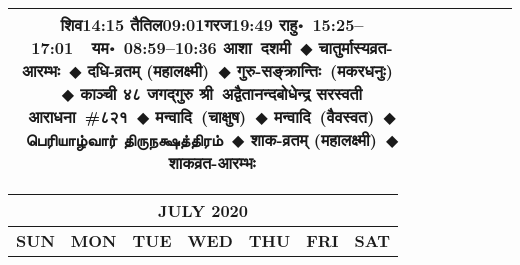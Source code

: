 \documentclass[a3paper,12pt,landscape]{article}
\newcommand{\eventsep}{~$\Diamondblack$ }
\newcommand{\To}{\hspace{1pt}\raisebox{0pt}{\tiny\RIGHTarrow}\hspace{1pt}}
\newcommand{\tamil}[1]{%
{\fontspec[Scale=0.9,FakeStretch=0.9]{Noto Sans Tamil} \footnotesize #1}}
\newcommand{\rahuyama}[2]{%
{राहु॰~\textsf{#1}~~यम॰~\textsf{#2}}
}
\begin{document}
\begin{center}
\begin{tabular}{|c|c|c|c|c|c|c|}
{{\mbox{शिव\To{}\textsf{14:15\hspace{2ex}}}}%
{\mbox{तैतिल\To{}\textsf{09:01\hspace{2ex}}}\mbox{गरज\To{}\textsf{19:49\hspace{2ex}}}}}%
{\rahuyama{15:25--17:01}{08:59--10:36}}%
{आशा~दशमी\eventsep चातुर्मास्यव्रत-आरम्भः\eventsep दधि-व्रतम् (महालक्ष्मी)\eventsep गुरु-सङ्क्रान्तिः~(मकर\To{}धनुः)\eventsep काञ्ची ४८ जगद्गुरु श्री~अद्वैतानन्दबोधेन्द्र सरस्वती आराधना~\#{८२१}\eventsep मन्वादि~(चाक्षुष)\eventsep मन्वादि~(वैवस्वत)\eventsep \tamil{பெரியாழ்வார் திருநக்ஷத்திரம்}\eventsep शाक-व्रतम् (महालक्ष्मी)\eventsep शाकव्रत-आरम्भः}
&
\mbox{}  & %
\mbox{}  & %
\mbox{}  & %
\\ \hline
\end{tabular}



\begin{tabular}{|c|c|c|c|c|c|c|}
\multicolumn{7}{c}{\Large \bfseries \sffamily JULY 2020}\\[3mm]
\hline
\textbf{\textsf{SUN}} & \textbf{\textsf{MON}} & \textbf{\textsf{TUE}} & \textbf{\textsf{WED}} & \textbf{\textsf{THU}} & \textbf{\textsf{FRI}} & \textbf{\textsf{SAT}} \\ \hline


\end{tabular}
\end{center}
\end{document}
